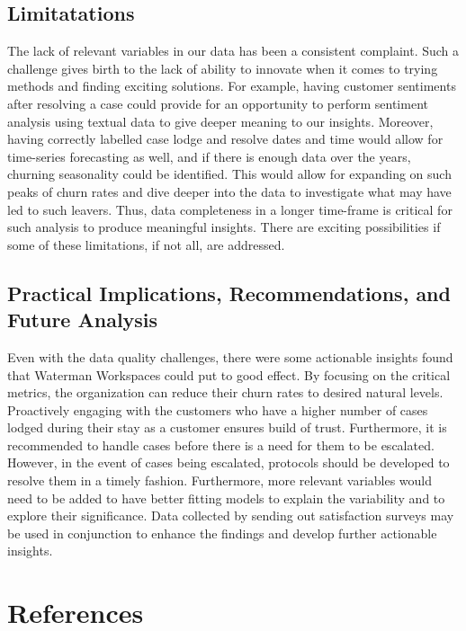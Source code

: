 \documentclass[
]{article}
\begin{document}
\subsection{Limitatations}\label{limitatations}

The lack of relevant variables in our data has been a consistent complaint. Such a challenge gives birth to the lack of ability to innovate when it comes to trying methods and finding exciting solutions. For example, having customer sentiments after resolving a case could provide for an opportunity to perform sentiment analysis using textual data to give deeper meaning to our insights. Moreover, having correctly labelled case lodge and resolve dates and time would allow for time-series forecasting as well, and if there is enough data over the years, churning seasonality could be identified. This would allow for expanding on such peaks of churn rates and dive deeper into the data to investigate what may have led to such leavers. Thus, data completeness in a longer time-frame is critical for such analysis to produce meaningful insights. There are exciting possibilities if some of these limitations, if not all, are addressed.

\subsection{Practical Implications, Recommendations, and Future Analysis}\label{practical-implications-recommendations-and-future-analysis}

Even with the data quality challenges, there were some actionable insights found that Waterman Workspaces could put to good effect. By focusing on the critical metrics, the organization can reduce their churn rates to desired natural levels. Proactively engaging with the customers who have a higher number of cases lodged during their stay as a customer ensures build of trust. Furthermore, it is recommended to handle cases before there is a need for them to be escalated. However, in the event of cases being escalated, protocols should be developed to resolve them in a timely fashion. Furthermore, more relevant variables would need to be added to have better fitting models to explain the variability and to explore their significance. Data collected by sending out satisfaction surveys may be used in conjunction to enhance the findings and develop further actionable insights.

\section{References}\label{references}
\end{document}
